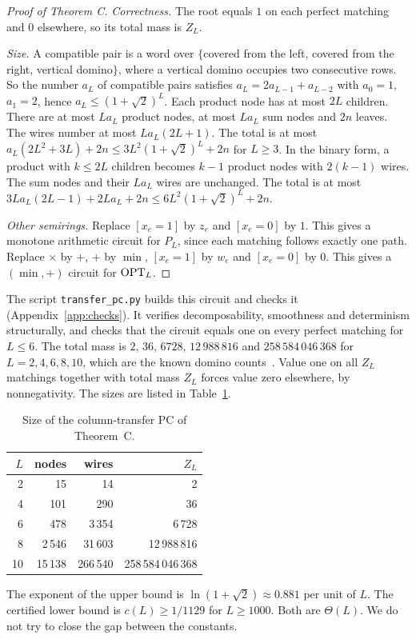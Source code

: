 \begin{proof}[Proof of Theorem C]
\emph{Correctness.} The root equals $1$ on each perfect matching and $0$ elsewhere, so its total mass is $Z_L$.

\emph{Size.} A compatible pair is a word over $\{$covered from the left, covered from the right, vertical domino$\}$, where a vertical domino occupies two consecutive rows. So the number $a_L$ of compatible pairs satisfies $a_L=2a_{L-1}+a_{L-2}$ with $a_0=1$, $a_1=2$, hence $a_L\le(1+\sqrt2)^L$. Each product node has at most $2L$ children. There are at most $La_L$ product nodes, at most $La_L$ sum nodes and $2n$ leaves. The wires number at most $La_L(2L+1)$. The total is at most $a_L(2L^2+3L)+2n\le3L^2(1+\sqrt2)^L+2n$ for $L\ge3$. In the binary form, a product with $k\le2L$ children becomes $k-1$ product nodes with $2(k-1)$ wires. The sum nodes and their $La_L$ wires are unchanged. The total is at most $3La_L(2L-1)+2La_L+2n\le6L^2(1+\sqrt2)^L+2n$.

\emph{Other semirings.} Replace $[x_e=1]$ by $z_e$ and $[x_e=0]$ by $1$. This gives a monotone arithmetic circuit for $P_L$, since each matching follows exactly one path. Replace $\times$ by $+$, $+$ by $\min$, $[x_e=1]$ by $w_e$ and $[x_e=0]$ by $0$. This gives a $(\min,+)$ circuit for $\mathrm{OPT}_L$.
\end{proof}

The script \texttt{transfer\_pc.py} builds this circuit and checks it (Appendix~\ref{app:checks}). It verifies decomposability, smoothness and determinism structurally, and checks that the circuit equals one on every perfect matching for $L\le6$. The total mass is $2$, $36$, $6728$, $12\,988\,816$ and $258\,584\,046\,368$ for $L=2,4,6,8,10$, which are the known domino counts~\cite{Kasteleyn61,TemperleyFisher61}. Value one on all $Z_L$ matchings together with total mass $Z_L$ forces value zero elsewhere, by nonnegativity. The sizes are listed in Table~\ref{tab:transfer}.

\begin{table}[h]
\centering\small
\begin{tabular}{@{}rrrr@{}}
\toprule
$L$ & nodes & wires & $Z_L$\\
\midrule
2 & 15 & 14 & 2\\
4 & 101 & 290 & 36\\
6 & 478 & 3\,354 & 6\,728\\
8 & 2\,546 & 31\,603 & 12\,988\,816\\
10 & 15\,138 & 266\,540 & 258\,584\,046\,368\\
\bottomrule
\end{tabular}
\caption{Size of the column-transfer PC of Theorem~C.}
\label{tab:transfer}
\end{table}

The exponent of the upper bound is $\ln(1+\sqrt2)\approx0.881$ per unit of $L$. The certified lower bound is $c(L)\ge1/1129$ for $L\ge1000$. Both are $\Theta(L)$. We do not try to close the gap between the constants.
